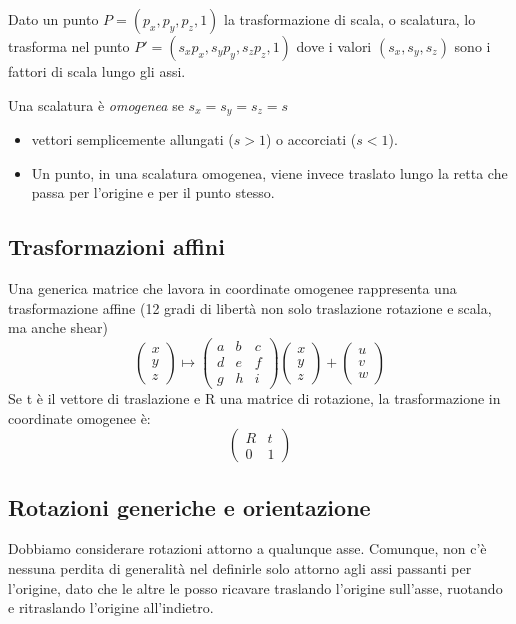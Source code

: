 \documentclass[a4paper, 10pt]{article}
\begin{document}
		\noindent
		Dato un punto $ P = (p_x, p_y, p_z, 1) $ la trasformazione di scala, o scalatura, lo trasforma nel punto $ P' = (s_x p_x, s_y p_y, s_z p_z, 1) $ dove i valori $ (s_x, s_y, s_z) $ sono i fattori di scala lungo gli assi.
		
		\noindent
		Una scalatura è \textit{omogenea} se $ s_x = s_y = s_z = s $ 
		
		\begin{itemize}
			\item vettori semplicemente allungati ($ s>1 $) o accorciati ($ s<1 $).
			\item Un punto, in una scalatura omogenea, viene invece traslato lungo la
				retta che passa per l'origine e per il punto stesso.
		\end{itemize}
		
	\subsection{Trasformazioni affini}
		Una generica matrice che lavora in coordinate omogenee
		rappresenta una trasformazione affine (12 gradi di libertà non
		solo traslazione rotazione e scala, ma anche shear)
		\[
		\begin{pmatrix}
			x \\
			y \\
			z
		\end{pmatrix}
		\mapsto
		\begin{pmatrix}
			a & b & c \\
			d & e & f \\
			g & h & i
		\end{pmatrix}
		\begin{pmatrix}
			x \\
			y \\
			z
		\end{pmatrix}
		+
		\begin{pmatrix}
			u \\
			v \\
			w
		\end{pmatrix}
		\]
		Se t è il vettore di traslazione e R una matrice di rotazione, la
		trasformazione in coordinate omogenee è:
		\[
			\begin{pmatrix}
				R & t \\
				0 & 1
			\end{pmatrix}
		\]
	\subsection{Rotazioni generiche e orientazione}
		Dobbiamo considerare rotazioni attorno a qualunque asse.
		Comunque, non c'è nessuna perdita di generalità nel definirle
		solo attorno agli assi passanti per l'origine, dato che le altre le
		posso ricavare traslando l'origine sull'asse, ruotando e
		ritraslando l'origine all'indietro.
		
\end{document}
